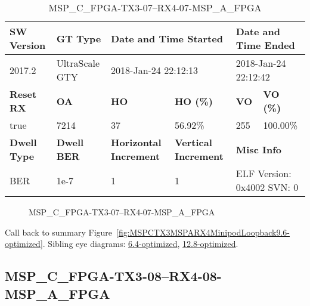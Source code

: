 \begin{table}[h]
\centering
\caption{MSP\_C\_FPGA-TX3-07--RX4-07-MSP\_A\_FPGA}
\label{tab:MSPCFPGATX307RX407MSPAFPGA9.6-optimized}
\begin{tabular}{@{}|l|l|l|l|l|l|@{}}
\toprule
\textbf{SW Version}                & \textbf{GT Type}   & \multicolumn{2}{l|}{\textbf{Date and Time Started}}            & \multicolumn{2}{l|}{\textbf{Date and Time Ended}}        \\ \midrule
2017.2                       & UltraScale GTY          & \multicolumn{2}{l|}{2018-Jan-24 22:12:13}                   & \multicolumn{2}{l|}{2018-Jan-24 22:12:42}               \\ \midrule
\textbf{Reset RX}                  & \textbf{OA} & \textbf{HO}   & \textbf{HO (\%)} & \textbf{VO} & \textbf{VO (\%)} \\ \midrule
true & 7214        & 37          & 56.92\%        & 255        & 100.00\%       \\ \midrule
\textbf{Dwell Type}                & \textbf{Dwell BER} & \textbf{Horizontal Increment} & \textbf{Vertical Increment}    & \multicolumn{2}{l|}{\textbf{Misc Info}}                  \\ \midrule
BER                            & 1e-7        & 1        & 1           & \multicolumn{2}{l|}{ELF Version: 0x4002 SVN: 0}                         \\ \bottomrule
\end{tabular}
\end{table}

\begin{figure}[h]
\caption{MSP\_C\_FPGA-TX3-07--RX4-07-MSP\_A\_FPGA} \label{fig:MSPCFPGATX307RX407MSPAFPGA9.6-optimized}
\end{figure}

Call back to summary Figure~\ref{fig:MSPCTX3MSPARX4MinipodLoopback9.6-optimized}.
Sibling eye diagrams: \hyperref[sec:MSPCFPGATX307RX407MSPAFPGA6.4-optimized]{6.4-optimized}, \hyperref[sec:MSPCFPGATX307RX407MSPAFPGA12.8-optimized]{12.8-optimized}.

\clearpage
\newpage


\subsection{MSP\_C\_FPGA-TX3-08--RX4-08-MSP\_A\_FPGA}\label{sec:MSPCFPGATX308RX408MSPAFPGA9.6-optimized}

